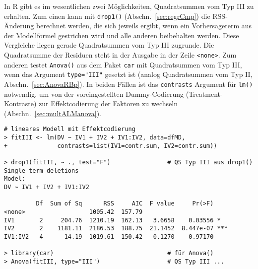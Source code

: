 In R gibt es im wesentlichen zwei Möglichkeiten, Quadratsummen vom Typ III zu erhalten. Zum einen kann mit \lstinline!drop1()! (Abschn.\ \ref{sec:regrCmp}) die RSS-Änderung berechnet werden, die sich jeweils ergibt, wenn ein Vorhersageterm aus der Modellformel gestrichen wird und alle anderen beibehalten werden. Diese Vergleiche liegen gerade Quadratsummen vom Typ III zugrunde. Die Quadratsumme der Residuen steht in der Ausgabe in der Zeile \lstinline!<none>!. Zum anderen testet \lstinline!Anova()! aus dem Paket \lstinline!car! mit Quadratsummen vom Typ III, wenn das Argument \lstinline!type="III"! gesetzt ist (analog Quadratsummen vom Typ II, Abschn.\ \ref{sec:AnovaRBp}). In beiden Fällen ist das \lstinline!contrasts! Argument für \lstinline!lm()! notwendig, um von der voreingestellten Dummy-Codierung (Treatment-Kontraste) zur Effektcodierung der Faktoren zu wechseln (Abschn.\ \ref{sec:multALManova}).
\begin{lstlisting}
# lineares Modell mit Effektcodierung
> fitIII <- lm(DV ~ IV1 + IV2 + IV1:IV2, data=dfMD,
+              contrasts=list(IV1=contr.sum, IV2=contr.sum))

> drop1(fitIII, ~ ., test="F")                # QS Typ III aus drop1()
Single term deletions
Model:
DV ~ IV1 + IV2 + IV1:IV2

         Df  Sum of Sq      RSS     AIC  F value     Pr(>F)
<none>                  1005.42  157.79
IV1       2     204.76  1210.19  162.13   3.6658    0.03556 *
IV2       2    1181.11  2186.53  188.75  21.1452  8.447e-07 ***
IV1:IV2   4      14.19  1019.61  150.42   0.1270    0.97170

> library(car)                                # für Anova()
> Anova(fitIII, type="III")                   # QS Typ III ...
\end{lstlisting}


